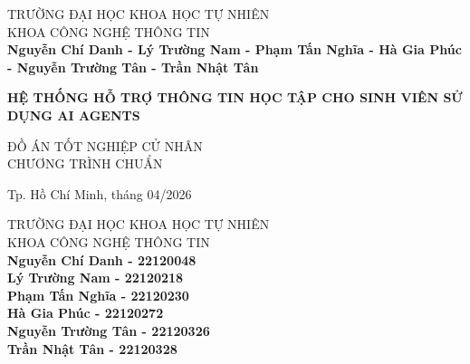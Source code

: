\begin{titlepage}

\begin{center}
TRƯỜNG ĐẠI HỌC KHOA HỌC TỰ NHIÊN\\
KHOA CÔNG NGHỆ THÔNG TIN\\[2cm]


{ \Large \bfseries Nguyễn Chí Danh - Lý Trường Nam - Phạm Tấn Nghĩa - Hà Gia Phúc - Nguyễn Trường Tân - Trần Nhật Tân\\[2cm] } 


{ \Large \bfseries HỆ THỐNG HỖ TRỢ THÔNG TIN HỌC TẬP CHO SINH VIÊN SỬ DỤNG AI AGENTS\\[3cm]} 


\large ĐỒ ÁN TỐT NGHIỆP CỬ NHÂN\\
\large CHƯƠNG TRÌNH CHUẨN\\



\vfill
Tp. Hồ Chí Minh, tháng 04/2026

\end{center}

\pagebreak



\begin{center}

TRƯỜNG ĐẠI HỌC KHOA HỌC TỰ NHIÊN\\
KHOA CÔNG NGHỆ THÔNG TIN\\[1cm]


{\large \bfseries Nguyễn Chí Danh - 22120048\\} 
{\large \bfseries Lý Trường Nam - 22120218\\} 
{\large \bfseries Phạm Tấn Nghĩa - 22120230\\} 
{\large \bfseries Hà Gia Phúc - 22120272\\} 
{\large \bfseries Nguyễn Trường Tân - 22120326\\} 
{\large \bfseries Trần Nhật Tân - 22120328\\[1cm]}


\end{center}
\end{titlepage}
